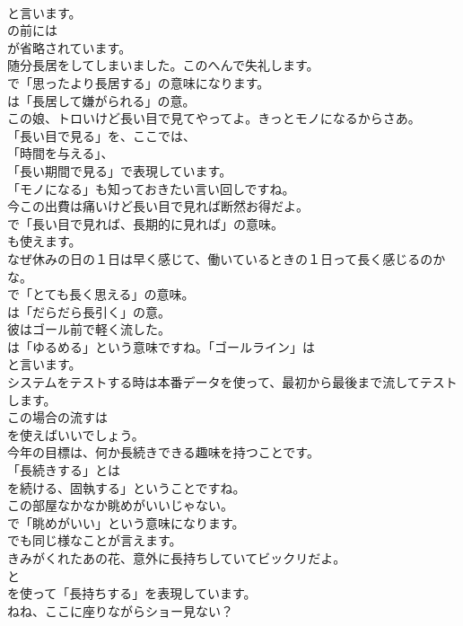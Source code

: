 \documentclass[8pt]{extreport}
\begin{document}
\begin{CJK}{UTF8}{min}
\\	と言います。
\\	の前には
\\	が省略されています。	
\\	随分長居をしてしまいました。このへんで失礼します。 
\\	で「思ったより長居する」の意味になります。
\\	は「長居して嫌がられる」の意。	
\\	この娘、トロいけど長い目で見てやってよ。きっとモノになるからさあ。 
\\	「長い目で見る」を、ここでは、
\\	「時間を与える」、
\\	「長い期間で見る」で表現しています。
\\	「モノになる」も知っておきたい言い回しですね。	
\\	今この出費は痛いけど長い目で見れば断然お得だよ。 
\\	で「長い目で見れば、長期的に見れば」の意味。
\\	も使えます。	
\\	なぜ休みの日の１日は早く感じて、働いているときの１日って長く感じるのかな。 
\\	で「とても長く思える」の意味。
\\	は「だらだら長引く」の意。	
\\	彼はゴール前で軽く流した。 
\\	は「ゆるめる」という意味ですね。「ゴールライン」は
\\	と言います。	
\\	システムをテストする時は本番データを使って、最初から最後まで流してテストします。 
\\	この場合の流すは
\\	を使えばいいでしょう。	
\\	今年の目標は、何か長続きできる趣味を持つことです。 
\\	「長続きする」とは
\\	を続ける、固執する」ということですね。	
\\	この部屋なかなか眺めがいいじゃない。 
\\	で「眺めがいい」という意味になります。
\\	でも同じ様なことが言えます。	
\\	きみがくれたあの花、意外に長持ちしていてビックリだよ。 
\\	と 
\\	を使って「長持ちする」を表現しています。	
\\	ねね、ここに座りながらショー見ない？ 

\end{CJK}
\end{document}
